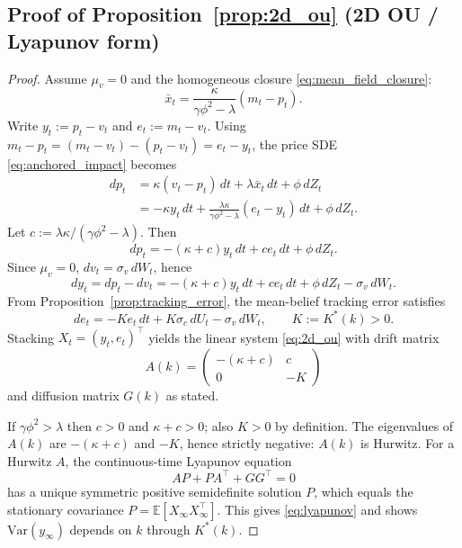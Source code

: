 \subsection*{Proof of Proposition~\ref{prop:2d_ou} (2D OU / Lyapunov form)}
\begin{proof}
Assume $\mu_v=0$ and the homogeneous closure \eqref{eq:mean_field_closure}:
\[
\bar x_t=\frac{\kappa}{\gamma\phi^2-\lambda}(m_t-p_t).
\]
Write $y_t:=p_t-v_t$ and $e_t:=m_t-v_t$. Using $m_t-p_t=(m_t-v_t)-(p_t-v_t)=e_t-y_t$, the price SDE \eqref{eq:anchored_impact} becomes
\[
\begin{aligned}
dp_t
&=\kappa(v_t-p_t)\,dt+\lambda \bar x_t\,dt+\phi\,dZ_t\\
&= -\kappa y_t\,dt + \frac{\lambda\kappa}{\gamma\phi^2-\lambda}(e_t-y_t)\,dt+\phi\,dZ_t.
\end{aligned}
\]
Let $c:=\lambda\kappa/(\gamma\phi^2-\lambda)$. Then
\[
dp_t=-(\kappa+c)y_t\,dt+c e_t\,dt+\phi\,dZ_t.
\]
Since $\mu_v=0$, $dv_t=\sigma_v\,dW_t$, hence
\[
dy_t=dp_t-dv_t=-(\kappa+c)y_t\,dt+c e_t\,dt+\phi\,dZ_t-\sigma_v\,dW_t.
\]
From Proposition~\ref{prop:tracking_error}, the mean-belief tracking error satisfies
\[
de_t=-K e_t\,dt+K\sigma_c\,dU_t-\sigma_v\,dW_t,
\qquad K:=K^*(k)>0.
\]
Stacking $X_t=(y_t,e_t)^\top$ yields the linear system \eqref{eq:2d_ou} with drift matrix
\[
A(k)=\begin{pmatrix}-(\kappa+c) & c\\ 0 & -K\end{pmatrix}
\]
and diffusion matrix $G(k)$ as stated.

If $\gamma\phi^2>\lambda$ then $c>0$ and $\kappa+c>0$; also $K>0$ by definition. The eigenvalues of $A(k)$ are
$-(\kappa+c)$ and $-K$, hence strictly negative: $A(k)$ is Hurwitz. For a Hurwitz $A$, the continuous-time Lyapunov equation
\[
A P + P A^\top + G G^\top = 0
\]
has a unique symmetric positive semidefinite solution $P$, which equals the stationary covariance $P=\mathbb E[X_\infty X_\infty^\top]$.
This gives \eqref{eq:lyapunov} and shows $\mathrm{Var}(y_\infty)$ depends on $k$ through $K^*(k)$.
\end{proof}

